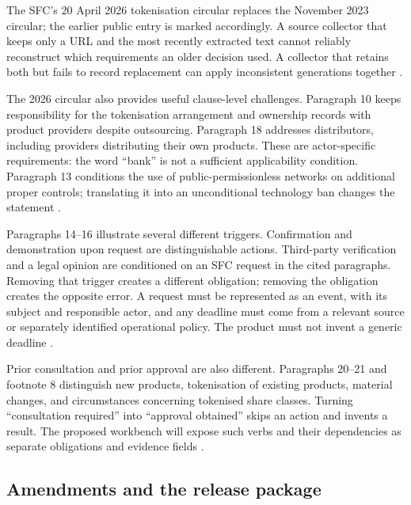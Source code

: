 The SFC's 20 April 2026 tokenisation circular replaces the November 2023 circular;
the earlier public entry is marked accordingly. A source collector that keeps
only a URL and the most recently extracted text cannot reliably reconstruct
which requirements an older decision used. A collector that retains both but
fails to record replacement can apply inconsistent generations together
\citep{sfctoken2023,sfctoken2026}.

The 2026 circular also provides useful clause-level challenges. Paragraph 10
keeps responsibility for the tokenisation arrangement and ownership records
with product providers despite outsourcing. Paragraph 18 addresses distributors,
including providers distributing their own products. These are actor-specific
requirements: the word ``bank'' is not a sufficient applicability condition.
Paragraph 13 conditions the use of public-permissionless networks on additional
proper controls; translating it into an unconditional technology ban changes the
statement \citep[paras.~10, 13, 18]{sfctoken2026}.


Paragraphs 14--16 illustrate several different triggers. Confirmation and
demonstration upon request are distinguishable actions. Third-party verification
and a legal opinion are conditioned on an SFC request in the cited paragraphs.
Removing that trigger creates a different obligation; removing the obligation
creates the opposite error. A request must be represented as an event, with its
subject and responsible actor, and any deadline must come from a relevant source
or separately identified operational policy. The product must not invent a
generic deadline \citep[paras.~14--16]{sfctoken2026}.

Prior consultation and prior approval are also different. Paragraphs 20--21 and
footnote 8 distinguish new products, tokenisation of existing products, material
changes, and circumstances concerning tokenised share classes. Turning
``consultation required'' into ``approval obtained'' skips an action and invents
a result. The proposed workbench will expose such verbs and their dependencies
as separate obligations and evidence fields \citep[paras.~20--21 and n.~8]{sfctoken2026}.

\subsection{Amendments and the release package}
\label{merge:P-03-product:09}


